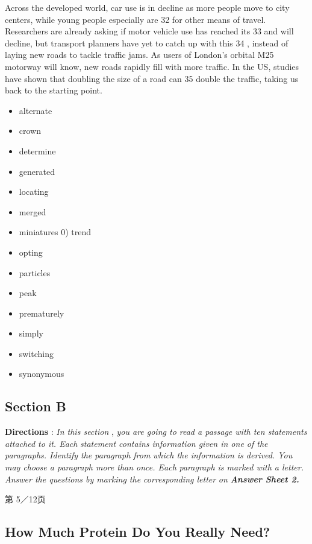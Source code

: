\documentclass[UTF8,11pt]{ctexart}
\begin{document}
Across the developed world, car use is in decline as more people move to city centers, while young people especially are 32 for other means of travel. Researchers are already asking if motor vehicle use has reached its 33 and will decline, but transport planners have yet to catch up with this 34 , instead of laying new roads to tackle traffic jams. As users of London's orbital M25 motorway will know, new roads rapidly fill with more traffic. In the US, studies have shown that doubling the size of a road can 35 double the traffic, taking us back to the starting point.


\begin{itemize}[leftmargin=2em,itemsep=.2em,topsep=.4em]\item[A.] alternate
\item[B.] crown
\item[C.] determine
\item[D.] generated
\item[E.] locating
\item[F.] merged
\item[G.] miniatures 0) trend
\item[H.] opting
\item[I.] particles
\item[J.] peak
\item[K.] prematurely
\item[L.] simply
\item[M.] switching
\item[N.] synonymous
\end{itemize}

\subsection*{\textbf{Section B}}


\textbf{Directions }: \textit{In this section }, \textit{you are going to read a passage with ten statements attached to it. Each} \textit{statement contains information given in one of the paragraphs. Identify the paragraph from} \textit{which the information is derived. You may choose a paragraph more than once. Each} \textit{paragraph is marked with a letter. Answer the questions by marking the corresponding letter} \textit{on }\textbf{\textit{Answer Sheet 2.}}


第 5／12页


\subsection*{\textbf{How Much Protein Do You Really Need?}}
\end{document}
